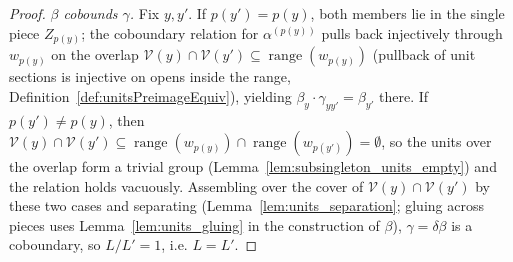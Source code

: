 \begin{proof}
  \emph{\(\beta\) cobounds \(\gamma\).} Fix \(y, y'\). If \(p(y') = p(y)\), both members lie in the
  single piece \(Z_{p(y)}\); the coboundary relation for \(\alpha^{(p(y))}\) pulls back injectively
  through \(w_{p(y)}\) on the overlap \(\mathcal V(y) \cap \mathcal V(y') \subseteq
  \operatorname{range}(w_{p(y)})\) (pullback of unit sections is injective on opens inside the
  range, Definition~\ref{def:unitsPreimageEquiv}), yielding
  \(\beta_y \cdot \gamma_{yy'} = \beta_{y'}\) there. If \(p(y') \ne p(y)\), then
  \(\mathcal V(y) \cap \mathcal V(y') \subseteq \operatorname{range}(w_{p(y)}) \cap
  \operatorname{range}(w_{p(y')}) = \emptyset\), so the units over the overlap form a trivial group
  (Lemma~\ref{lem:subsingleton_units_empty}) and the relation holds vacuously. Assembling over the
  cover of \(\mathcal V(y) \cap \mathcal V(y')\) by these two cases and separating
  (Lemma~\ref{lem:units_separation}; gluing across pieces uses Lemma~\ref{lem:units_gluing} in the
  construction of \(\beta\)), \(\gamma = \delta\beta\) is a coboundary, so \(L/L' = 1\), i.e.
  \(L = L'\).
\end{proof}

